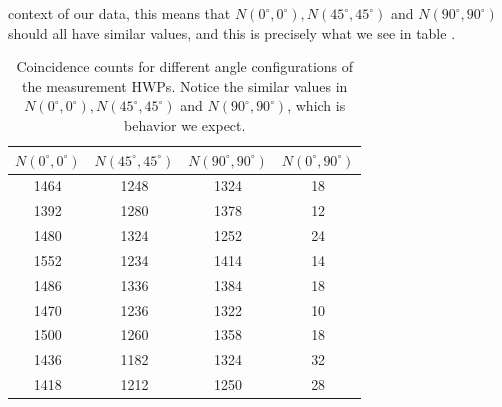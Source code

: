 \documentclass[10pt]{article}
\begin{document}
	context of our data, this means that \( N(0^{\circ}, 0^{\circ}), N(45^{\circ}, 45^{\circ}) \) and 
	\( N(90^{\circ}, 90^{\circ}) \) should all have similar values, and this is precisely what we see in
	table \cite{dehlinger}. 
	\begin{table}[]
		\centering
		\def\arraystretch{1.3}
		\begin{tabular}{|c|c|c|c|}
			\hline
			\( N(0^{\circ}, 0^{\circ}) \) & \( N(45^{\circ}, 45^{\circ}) \) & \( N(90^{\circ}, 90^{\circ})
			\)& \( N(0^{\circ}, 90^{\circ}) \)\\ \hline
			1464                                 & 1248               & 1324                                   & 18                \\
			1392                                 & 1280               & 1378                                   & 12                \\
			1480                                 & 1324               & 1252                                   & 24                \\
			1552                                 & 1234               & 1414                                   & 14                \\
			1486                                 & 1336               & 1384                                   & 18                \\
			1470                                 & 1236               & 1322                                   & 10                \\
			1500                                 & 1260               & 1358                                   & 18                \\
			1436                                 & 1182               & 1324                                   & 32                \\
			1418                                 & 1212               & 1250                                   & 28   \\ \hline            
		\end{tabular}
		\caption{Coincidence counts for different angle configurations of the measurement HWPs. Notice the
		similar values in \( N(0^{\circ}, 0^{\circ}), N(45^{\circ}, 45^{\circ}) \) and \( N(90^{\circ},
	90^{\circ}) \), which is behavior we expect.}
		\label{char-table}
	\end{table}
\end{document}
